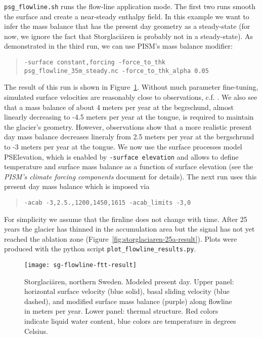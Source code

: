 \texttt{psg_flowline.sh} runs the flow-line application mode. The first two runs smooth the surface and create a near-steady enthalpy field. In this example we want to infer the mass balance that has the present day geometry as a steady-state (for now, we ignore the fact that Storglaci{\"a}ren is probably not in a steady-state). As demonstrated in the third run, we can use PISM's mass balance modifier:
\begin{quote}\small
\begin{verbatim}
-surface constant,forcing -force_to_thk psg_flowline_35m_steady.nc -force_to_thk_alpha 0.05
\end{verbatim}
\normalsize\end{quote}
The result of this run is shown in Figure~\ref{fig:storglaciaren-ftt-result}. Without much parameter fine-tuning, simulated surface velocities are reasonably close to observations, c.f. \cite{AschwandenBlatter}.  We also see that a mass balance of about 4 meters per year at the begrschund, almost linearly decreasing to -4.5 meters per year at the tongue, is required to maintain the glacier's geometry. However, observations show that a more realistic present day mass balance decreases lineraly from 2.5 meters per year at the bergschrund to -3 meters per year at the tongue. We now use the surface processes model PSElevation, which is enabled by \texttt{-surface elevation} and allows to define temperature and surface mass balance as a function of surface elevation (see the \emph{PISM's climate forcing components} document for details). The next run uses this present day mass balance which is imposed via 
\begin{quote}\small
\begin{verbatim}
-acab -3,2.5.,1200,1450,1615 -acab_limits -3,0
\end{verbatim}
\normalsize\end{quote} 
For simplicity we assume that the firnline does not change with time. After 25 years the glacier has thinned in the accumulation area but the signal has not yet reached the ablation zone (Figure~\ref{fig:storglaciaren-25a-result}). Plots were produced with the python script \texttt{plot_flowline_results.py}.

\begin{figure}[ht]
  \centering
  \texttt{[image: sg-flowline-ftt-result]}
  \caption{Storglaci{\"a}ren, northern Sweden.  Modeled present day.  Upper panel: horizontal surface velocity (blue solid), basal sliding velocity (blue dashed), and modified surface mass balance (purple) along flowline in meters per year. Lower panel: thermal structure. Red colors indicate liquid water content, blue colors are temperature in degrees Celsius.}
  \label{fig:storglaciaren-ftt-result}
\end{figure}

